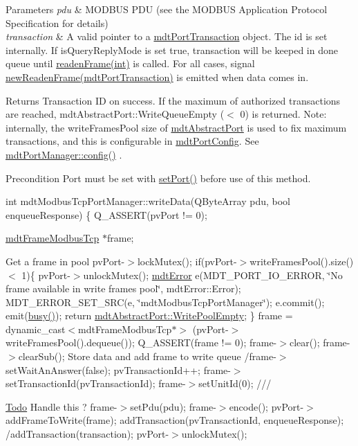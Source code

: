 \begin{DoxyParams}{Parameters}
{\em pdu} & MODBUS PDU (see the MODBUS Application Protocol Specification for details) \\
\hline
{\em transaction} & A valid pointer to a \hyperlink{classmdt_port_transaction}{mdtPortTransaction} object. The id is set internally. If isQueryReplyMode is set true, transaction will be keeped in done queue until \hyperlink{classmdt_port_manager_a830ae182d06dd6a52c43a7f45b9240ac}{readenFrame(int)} is called. For all cases, signal \hyperlink{classmdt_port_manager_a915ff3372cccd5f412b828cc81a3381f}{newReadenFrame(mdtPortTransaction)} is emitted when data comes in. \\
\hline
\end{DoxyParams}
\begin{DoxyReturn}{Returns}
Transaction ID on success. If the maximum of authorized transactions are reached, mdtAbstractPort::WriteQueueEmpty ($<$ 0) is returned. Note: internally, the writeFramesPool size of \hyperlink{classmdt_abstract_port}{mdtAbstractPort} is used to fix maximum transactions, and this is configurable in \hyperlink{classmdt_port_config}{mdtPortConfig}. See \hyperlink{classmdt_port_manager_a9cf3ea2da38f81682695b37448712ffd}{mdtPortManager::config()} . 
\end{DoxyReturn}
\begin{DoxyPrecond}{Precondition}
Port must be set with \hyperlink{classmdt_port_manager_afcd156b2d0c9d340999935efb6cd8cb6}{setPort()} before use of this method.
\end{DoxyPrecond}
int mdtModbusTcpPortManager::writeData(QByteArray pdu, bool enqueueResponse) \{ Q\_\-ASSERT(pvPort != 0);

\hyperlink{classmdt_frame_modbus_tcp}{mdtFrameModbusTcp} $\ast$frame;

Get a frame in pool pvPort-\/$>$lockMutex(); if(pvPort-\/$>$writeFramesPool().size() $<$ 1)\{ pvPort-\/$>$unlockMutex(); \hyperlink{classmdt_error}{mdtError} e(MDT\_\-PORT\_\-IO\_\-ERROR, \char`\"{}No frame available in write frames pool\char`\"{}, mdtError::Error); MDT\_\-ERROR\_\-SET\_\-SRC(e, \char`\"{}mdtModbusTcpPortManager\char`\"{}); e.commit(); emit(\hyperlink{classmdt_port_manager_a0936c65454409ffcf64ecb0632f6dbe3}{busy()}); return \hyperlink{classmdt_abstract_port_ad4121bb930c95887e77f8bafa065a85ea823db75227ad56b6aa74ea2f160c0693}{mdtAbstractPort::WritePoolEmpty}; \} frame = dynamic\_\-cast$<$mdtFrameModbusTcp$\ast$$>$ (pvPort-\/$>$writeFramesPool().dequeue()); Q\_\-ASSERT(frame != 0); frame-\/$>$clear(); frame-\/$>$clearSub(); Store data and add frame to write queue /frame-\/$>$setWaitAnAnswer(false); pvTransactionId++; frame-\/$>$setTransactionId(pvTransactionId); frame-\/$>$setUnitId(0); ///\begin{Desc}
\item[\hyperlink{todo__todo000017}{Todo}]Handle this ? frame-\/$>$setPdu(pdu); frame-\/$>$encode(); pvPort-\/$>$addFrameToWrite(frame); addTransaction(pvTransactionId, enqueueResponse); /addTransaction(transaction); pvPort-\/$>$unlockMutex();\end{Desc}


